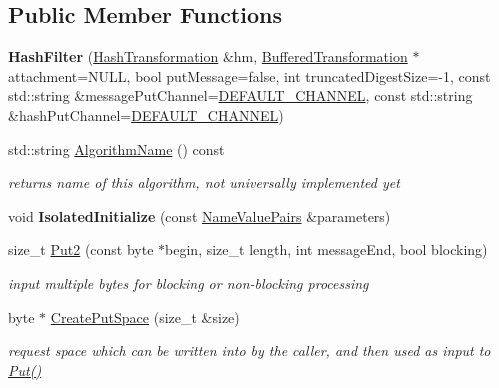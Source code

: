 \subsection*{Public Member Functions}
\begin{DoxyCompactItemize}
\item 
\hypertarget{class_hash_filter_a58b9949a468e798cc97d7b4c59a9d8c2}{
{\bfseries HashFilter} (\hyperlink{class_hash_transformation}{HashTransformation} \&hm, \hyperlink{class_buffered_transformation}{BufferedTransformation} $\ast$attachment=NULL, bool putMessage=false, int truncatedDigestSize=-\/1, const std::string \&messagePutChannel=\hyperlink{cryptlib_8h_a6f1917f54ea8c2a45de6e08c5087c8de}{DEFAULT\_\-CHANNEL}, const std::string \&hashPutChannel=\hyperlink{cryptlib_8h_a6f1917f54ea8c2a45de6e08c5087c8de}{DEFAULT\_\-CHANNEL})}
\label{class_hash_filter_a58b9949a468e798cc97d7b4c59a9d8c2}

\item 
\hypertarget{class_hash_filter_ac832515bc9e530470065c162d7bc7e9a}{
std::string \hyperlink{class_hash_filter_ac832515bc9e530470065c162d7bc7e9a}{AlgorithmName} () const }
\label{class_hash_filter_ac832515bc9e530470065c162d7bc7e9a}

\begin{DoxyCompactList}\small\item\em returns name of this algorithm, not universally implemented yet \item\end{DoxyCompactList}\item 
\hypertarget{class_hash_filter_a950c5cc22d2aa101e731401b10ff2be4}{
void {\bfseries IsolatedInitialize} (const \hyperlink{class_name_value_pairs}{NameValuePairs} \&parameters)}
\label{class_hash_filter_a950c5cc22d2aa101e731401b10ff2be4}

\item 
size\_\-t \hyperlink{class_hash_filter_a297dcb6efcd23ad55d90136ccc18c73b}{Put2} (const byte $\ast$begin, size\_\-t length, int messageEnd, bool blocking)
\begin{DoxyCompactList}\small\item\em input multiple bytes for blocking or non-\/blocking processing \item\end{DoxyCompactList}\item 
byte $\ast$ \hyperlink{class_hash_filter_a5c2f3a90ced66c835969ce1aa235b63e}{CreatePutSpace} (size\_\-t \&size)
\begin{DoxyCompactList}\small\item\em request space which can be written into by the caller, and then used as input to \hyperlink{class_buffered_transformation_ae70658b0d271f8e114ac6c3cc9774ede}{Put()} \item\end{DoxyCompactList}\end{DoxyCompactItemize}


